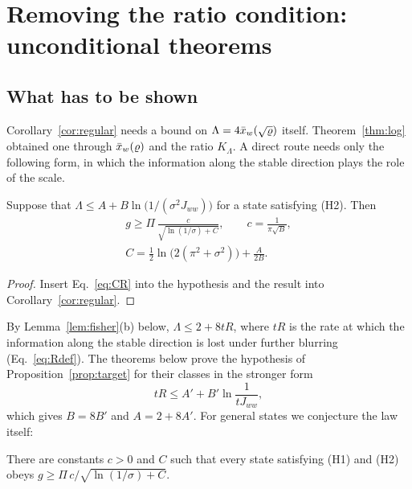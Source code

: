 \section{Removing the ratio condition: unconditional theorems}
\label{sec:removing}

\subsection{What has to be shown}

Corollary~\ref{cor:regular} needs a bound on $\Lambda = 4\bar{x}_w(\sqrt\varrho)$ itself. Theorem~\ref{thm:log} obtained one through $\bar{x}_w(\varrho)$ and the ratio $K_\Lambda$. A direct route needs only the following form, in which the information along the stable direction plays the role of the scale.

\begin{proposition}
\label{prop:target}
Suppose that $\Lambda \leq A + B\ln\big(1/(\sigma^2 J_{ww})\big)$ for a state satisfying (H2). Then
\begin{gather}
g \geq \Pi\,\frac{c}{\sqrt{\ln(1/\sigma) + C}}, \qquad c = \frac{1}{\pi\sqrt B}, \label{eq:target}\\
C = \frac12\ln\big(2(\pi^2 + \sigma^2)\big) + \frac{A}{2B}. \nonumber
\end{gather}
\end{proposition}

\begin{proof}
Insert Eq.~\eqref{eq:CR} into the hypothesis and the result into Corollary~\ref{cor:regular}.
\end{proof}

By Lemma~\ref{lem:fisher}(b) below, $\Lambda \leq 2 + 8tR$, where $tR$ is the rate at which the information along the stable direction is lost under further blurring (Eq.~\eqref{eq:Rdef}). The theorems below prove the hypothesis of Proposition~\ref{prop:target} for their classes in the stronger form
\begin{equation}
tR \leq A' + B'\ln\frac{1}{tJ_{ww}},
\label{eq:T2}
\end{equation}
which gives $B = 8B'$ and $A = 2 + 8A'$. For general states we conjecture the law itself:

\begin{conjecture}
\label{conj:general}
There are constants $c > 0$ and $C$ such that every state satisfying (H1) and (H2) obeys $g \geq \Pi\,c/\sqrt{\ln(1/\sigma) + C}$.
\end{conjecture}

